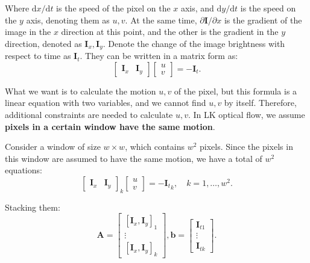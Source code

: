 {Where $\mathrm{d}x / \mathrm{d}t$ is the speed of the pixel on the $x$ axis, and $\mathrm{d}y/\mathrm{d}t$ is the speed on the $y$ axis, denoting them as $u,v$. At the same time, $\partial \bm{I}/{\partial x}$ is the gradient of the image in the $x$ direction at this point, and the other is the gradient in the $y$ direction, denoted as $\bm{I} _x, \bm{I}_y$. Denote the change of the image brightness with respect to time as $\bm{I}_t$. They can be written in a matrix form as:
\begin{equation}
\left[ {\begin{array}{*{20}{c}}
	{{ \bm{I}_x}}&{{ \bm{I}_y}}
	\end{array}} \right]\left[ \begin{array}{l}
u\\
v
\end{array} \right] =  - {\bm{I}_t}.
\end{equation}

What we want is to calculate the motion $u,v$ of the pixel, but this formula is a linear equation with two variables, and we cannot find $u,v$ by itself. Therefore, additional constraints are needed to calculate $u,v$. In LK optical flow, we assume \textbf{pixels in a certain window have the same motion}.

Consider a window of size $w \times w$, which contains $w^2$ pixels. Since the pixels in this window are assumed to have the same motion, we have a total of $w^2$ equations:
\begin{equation}
\left[ {\begin{array}{*{20}{c}}
	{{ \bm{I}_x}}&{{ \bm{I}_y}}
	\end{array}} \right]_k
\left[ \begin{array}{l}
u\\
v
\end{array} \right] =  - {\bm{I}_t}_k, \quad k=1, \ldots, w^2.
\end{equation}

Stacking them:
\begin{equation}
\bm{A} = \left[ {\begin{array}{*{20}{c}}
	{{{\left[ {{\bm{I}_x},{\bm{I}_y}} \right]}_1}}\\
	\vdots \\
	{{{\left[ {{\bm{I}_x},{\bm{I}_y}} \right]}_k}}
	\end{array}} \right],\bm{b} = \left[ {\begin{array}{*{20}{c}}
	{{ \bm{I}_{t1}}}\\
	\vdots \\
	{{ \bm{I}_{tk}}}
	\end{array}} \right].
\end{equation}

}
